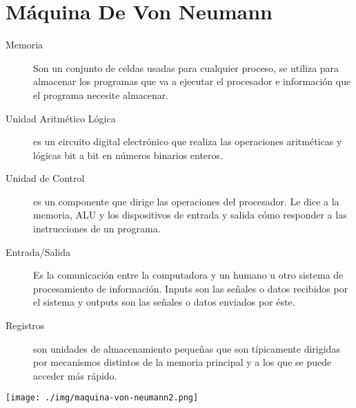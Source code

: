 \documentclass[12pt]{article}
\begin{document}
\section{Máquina De Von Neumann}
\label{sec:org50141f6}
\begin{description}
\item[{Memoria}] Son un conjunto de celdas usadas para cualquier proceso, se utiliza para almacenar los programas que va a ejecutar el procesador e información que el programa necesite almacenar.

\item[{Unidad Aritmético Lógica}] es un circuito digital electrónico que realiza las operaciones aritméticas y lógicas bit a bit en números binarios enteros.

\item[{Unidad de Control}] es un componente que dirige las operaciones del procesador. Le dice a la memoria, ALU y los dispositivos de entrada y salida cómo responder a las instrucciones de un programa.

\item[{Entrada/Salida}] Es la comunicación entre la computadora y un humano u otro sistema de procesamiento de información. Inputs son las señales o datos recibidos por el sistema y outputs son las señales o datos enviados por éste.

\item[{Registros}] son unidades de almacenamiento pequeñas que son típicamente dirigidas por mecanismos distintos de la memoria principal y a los que se puede acceder más rápido.
\end{description}

\begin{center}
\texttt{[image: ./img/maquina-von-neumann2.png]}
\end{center}
\end{document}
